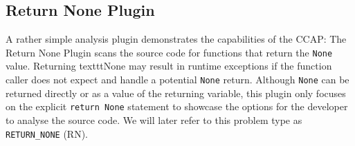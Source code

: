 \subsection{Return None Plugin}\label{sec:return_none_ccap_implementation}
A rather simple analysis plugin demonstrates the capabilities of the CCAP: The Return None Plugin scans the source code for functions that return the \texttt{None} value. Returning texttt{None} may result in runtime exceptions if the function caller does not expect and handle a potential \texttt{None} return. Although \texttt{None} can be returned directly or as a value of the returning variable, this plugin only focuses on the explicit \texttt{return None} statement to showcase the options for the developer to analyse the source code. We will later refer to this problem type as \texttt{RETURN\_NONE} (RN).

